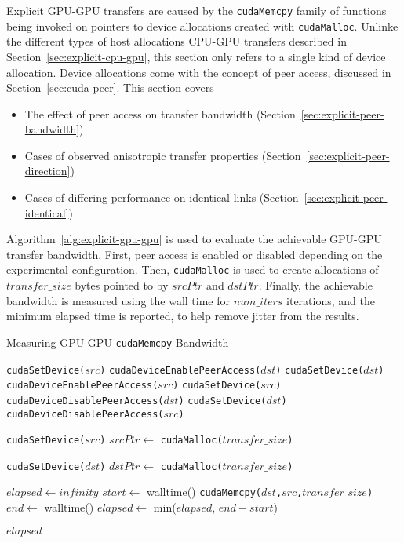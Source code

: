 Explicit GPU-GPU transfers are caused by the \texttt{cudaMemcpy} family of functions being invoked on pointers to device allocations created with \texttt{cudaMalloc}.
Unlinke the different types of host allocations CPU-GPU transfers described in Section~\ref{sec:explicit-cpu-gpu}, this section only refers to a single kind of device allocation.
Device allocations come with the concept of peer access, discussed in Section~\ref{sec:cuda-peer}.
This section covers
\begin{itemize}
	\item The effect of peer access on transfer bandwidth (Section~\ref{sec:explicit-peer-bandwidth})
	\item Cases of observed anisotropic transfer properties (Section~\ref{sec:explicit-peer-direction})
	\item Cases of differing performance on identical links (Section~\ref{sec:explicit-peer-identical})
\end{itemize}

Algorithm~\ref{alg:explicit-gpu-gpu} is used to evaluate the achievable GPU-GPU transfer bandwidth.
First, peer access is enabled or disabled depending on the experimental configuration.
Then, \texttt{cudaMalloc} is used to create allocations of $transfer\_size$ bytes pointed to by $srcPtr$ and $dstPtr$.
Finally, the achievable bandwidth is measured using the wall time for $num\_iters$ iterations, and the minimum elapsed time is reported, to help remove jitter from the results.

\begin{algorithm}[H]
	\caption[Measuring GPU-GPU \texttt{cudaMemcpy} Bandwidth]{Measuring GPU-GPU \texttt{cudaMemcpy} Bandwidth}
	\label{alg:explicit-gpu-gpu}
	\begin{algorithmic}[1]
		\Statex
		\State \texttt{cudaSetDevice($src$)}
		\State \texttt{cudaDeviceEnablePeerAccess($dst$)}
		\State \texttt{cudaSetDevice($dst$)}
		\State \texttt{cudaDeviceEnablePeerAccess($src$)}
		\Else
		\State \texttt{cudaSetDevice($src$)}
		\State \texttt{cudaDeviceDisablePeerAccess($dst$)}
		\State \texttt{cudaSetDevice($dst$)}
		\State \texttt{cudaDeviceDisablePeerAccess($src$)}        
		\EndIf
		
		\State \texttt{cudaSetDevice($src$)} 
		\State $srcPtr \gets$ \texttt{cudaMalloc($transfer\_size$)}
		
		\State \texttt{cudaSetDevice($dst$)} 
		\State $dstPtr \gets$ \texttt{cudaMalloc($transfer\_size$)}
		
		\State $elapsed \gets infinity$ 
		\State $start \gets$ walltime()
		\State \texttt{cudaMemcpy($dst$,$src$,$transfer\_size$)}
		\State $end \gets$ walltime()
		\State $elapsed \gets$ min($elapsed$, $end-start$)
		\EndFor
		
		\Return $elapsed$
		\EndFunction
		
	\end{algorithmic}
\end{algorithm}

